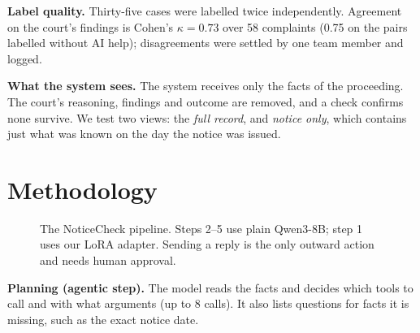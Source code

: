 \documentclass[10pt,a4paper]{article}
\begin{document}
\textbf{Label quality.} Thirty-five cases were labelled twice independently. Agreement on the court's findings is Cohen's $\kappa = 0.73$ \cite{cohen} over 58 complaints (0.75 on the pairs labelled without AI help); disagreements were settled by one team member and logged.

\textbf{What the system sees.} The system receives only the facts of the proceeding. The court's reasoning, findings and outcome are removed, and a check confirms none survive. We test two views: the \emph{full record}, and \emph{notice only}, which contains just what was known on the day the notice was issued.

\section{Methodology}

\begin{figure}[H]
\centering
{}
\caption{The NoticeCheck pipeline. Steps 2--5 use plain Qwen3-8B; step 1 uses our LoRA adapter. Sending a reply is the only outward action and needs human approval.}
\end{figure}

\textbf{Planning (agentic step).} The model reads the facts and decides which tools to call and with what arguments (up to 8 calls). It also lists questions for facts it is missing, such as the exact notice date.
\end{document}
